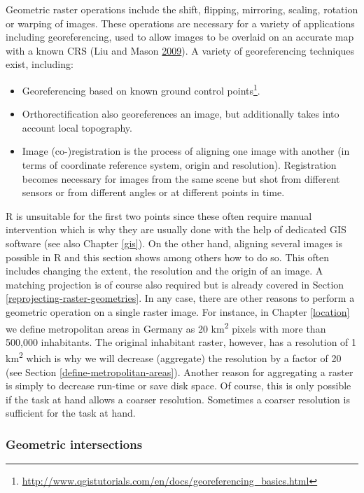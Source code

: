 \documentclass[]{krantz}
\providecommand{\tightlist}{%
  \setlength{\itemsep}{0pt}\setlength{\parskip}{0pt}}
\let\rmarkdownfootnote\footnote%
\def\footnote{\protect\rmarkdownfootnote}
\renewcommand{\href}[2]{#2\footnote{\url{#1}}}
\begin{document}
Geometric raster operations include the shift, flipping, mirroring, scaling, rotation or warping of images.
These operations are necessary for a variety of applications including georeferencing, used to allow images to be overlaid on an accurate map with a known CRS (Liu and Mason \protect\hyperlink{ref-liu_essential_2009}{2009}).
A variety of georeferencing techniques exist, including:

\begin{itemize}
\tightlist
\item
  Georeferencing based on known \href{http://www.qgistutorials.com/en/docs/georeferencing_basics.html}{ground control points}.
\item
  Orthorectification also georeferences an image, but additionally takes into account local topography.
\item
  Image (co-)registration is the process of aligning one image with another (in terms of coordinate reference system, origin and resolution).
  Registration becomes necessary for images from the same scene but shot from different sensors or from different angles or at different points in time.
\end{itemize}

R is unsuitable for the first two points since these often require manual intervention which is why they are usually done with the help of dedicated GIS software (see also Chapter \ref{gis}).
On the other hand, aligning several images is possible in R and this section shows among others how to do so.
This often includes changing the extent, the resolution and the origin of an image.
A matching projection is of course also required but is already covered in Section \ref{reprojecting-raster-geometries}.
In any case, there are other reasons to perform a geometric operation on a single raster image.
For instance, in Chapter \ref{location} we define metropolitan areas in Germany as 20 km\textsuperscript{2} pixels with more than 500,000 inhabitants.
The original inhabitant raster, however, has a resolution of 1 km\textsuperscript{2} which is why we will decrease (aggregate) the resolution by a factor of 20 (see Section \ref{define-metropolitan-areas}).
Another reason for aggregating a raster is simply to decrease run-time or save disk space.
Of course, this is only possible if the task at hand allows a coarser resolution.
Sometimes a coarser resolution is sufficient for the task at hand.

\hypertarget{geometric-intersections}{%
\subsubsection{Geometric intersections}\label{geometric-intersections}}
\end{document}
